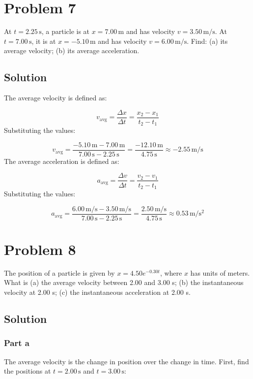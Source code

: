 \documentclass{article}
\newcommand{\meter}{\text{m}}
\newcommand{\second}{\text{s}}
\begin{document}
\section*{Problem 7}
At \( t = 2.25 \, \si{\second} \), a particle is at \( x = 7.00 \, \si{\meter} \) and has velocity \( v = 3.50 \, \si{\meter\per\second} \). At \( t = 7.00 \, \si{\second} \), it is at \( x = -5.10 \, \si{\meter} \) and has velocity \( v = 6.00 \, \si{\meter\per\second} \). Find: (a) its average velocity; (b) its average acceleration.

\subsection*{Solution}
The average velocity is defined as:

\[
v_{\text{avg}} = \frac{\Delta x}{\Delta t} = \frac{x_2 - x_1}{t_2 - t_1}
\]
Substituting the values:

\[
v_{\text{avg}} = \frac{-5.10 \, \si{\meter} - 7.00 \, \si{\meter}}{7.00 \, \si{\second} - 2.25 \, \si{\second}} = \frac{-12.10 \, \si{\meter}}{4.75 \, \si{\second}} \approx -2.55 \, \si{\meter\per\second}
\]
The average acceleration is defined as:

\[
a_{\text{avg}} = \frac{\Delta v}{\Delta t} = \frac{v_2 - v_1}{t_2 - t_1}
\]
Substituting the values:

\[
a_{\text{avg}} = \frac{6.00 \, \si{\meter\per\second} - 3.50 \, \si{\meter\per\second}}{7.00 \, \si{\second} - 2.25 \, \si{\second}} = \frac{2.50 \, \si{\meter\per\second}}{4.75 \, \si{\second}} \approx 0.53 \, \si{\meter\per\second^2}
\]

\section*{Problem 8}
The position of a particle is given by \( x = 4.50e^{-0.30t} \), where \( x \) has units of meters. What is (a) the average velocity between 2.00 and 3.00 s; (b) the instantaneous velocity at 2.00 s; (c) the instantaneous acceleration at 2.00 s.

\subsection*{Solution}
\subsubsection*{Part a}
The average velocity is the change in position over the change in time. First, find the positions at \( t = 2.00 \, \si{\second} \) and \( t = 3.00 \, \si{\second} \):
\end{document}
